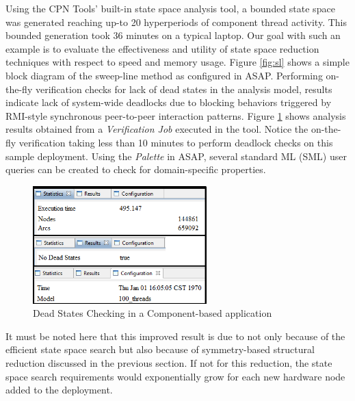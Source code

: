Using the CPN Tools' built-in state space analysis tool, a bounded state space was generated reaching up-to 20 hyperperiods of component thread activity. This bounded generation took 36 minutes on a typical laptop. Our goal with such an example is to evaluate the effectiveness and utility of state space reduction techniques with respect to speed and memory usage. Figure \ref{fig:sl} shows a simple block diagram of the sweep-line method as configured in ASAP. Performing on-the-fly verification checks for lack of dead states in the analysis model, results indicate lack of system-wide deadlocks due to blocking behaviors triggered by RMI-style synchronous peer-to-peer interaction patterns. Figure \ref{fig:ds} shows analysis results obtained from a \emph{Verification Job} executed in the tool. Notice the on-the-fly verification taking less than 10 minutes to perform deadlock checks on this sample deployment. Using the \emph{Palette} in ASAP, several standard ML (SML) user queries can be created to check for domain-specific properties. 

\begin{figure}[h]
	\centering
	\includegraphics[width=0.6\textwidth]{./img/asap}
	\caption{Dead States Checking in a Component-based application}
	\label{fig:ds}
\end{figure}

It must be noted here that this improved result is due to not only because of the efficient state space search but also because of symmetry-based structural reduction discussed in the previous section. If not for this reduction, the state space search requirements would exponentially grow for each new hardware node added to the deployment. 